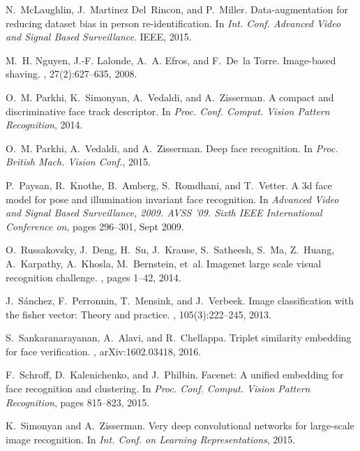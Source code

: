 \documentclass[runningheads]{llncs}
\begin{document}
\begin{thebibliography}{10}
N.~McLaughlin, J.~Martinez Del~Rincon, and P.~Miller.
\newblock Data-augmentation for reducing dataset bias in person
  re-identification.
\newblock In {\em Int. Conf. Advanced Video and Signal Based Surveillance}.
  IEEE, 2015.

M.~H. Nguyen, J.-F. Lalonde, A.~A. Efros, and F.~De~la Torre.
\newblock Image-based shaving.
, 27(2):627--635, 2008.

O.~M. Parkhi, K.~Simonyan, A.~Vedaldi, and A.~Zisserman.
\newblock A compact and discriminative face track descriptor.
\newblock In {\em Proc. Conf. Comput. Vision Pattern Recognition}, 2014.

O.~M. Parkhi, A.~Vedaldi, and A.~Zisserman.
\newblock Deep face recognition.
\newblock In {\em Proc. British Mach. Vision Conf.}, 2015.

P.~Paysan, R.~Knothe, B.~Amberg, S.~Romdhani, and T.~Vetter.
\newblock A 3d face model for pose and illumination invariant face recognition.
\newblock In {\em Advanced Video and Signal Based Surveillance, 2009. AVSS '09.
  Sixth IEEE International Conference on}, pages 296--301, Sept 2009.

O.~Russakovsky, J.~Deng, H.~Su, J.~Krause, S.~Satheesh, S.~Ma, Z.~Huang,
  A.~Karpathy, A.~Khosla, M.~Bernstein, et~al.
\newblock Imagenet large scale visual recognition challenge.
, pages 1--42, 2014.

J.~S{\'a}nchez, F.~Perronnin, T.~Mensink, and J.~Verbeek.
\newblock Image classification with the fisher vector: Theory and practice.
, 105(3):222--245, 2013.

S.~Sankaranarayanan, A.~Alavi, and R.~Chellappa.
\newblock Triplet similarity embedding for face verification.
, arXiv:1602.03418, 2016.

F.~Schroff, D.~Kalenichenko, and J.~Philbin.
\newblock Facenet: A unified embedding for face recognition and clustering.
\newblock In {\em Proc. Conf. Comput. Vision Pattern Recognition}, pages
  815--823, 2015.

K.~Simonyan and A.~Zisserman.
\newblock Very deep convolutional networks for large-scale image recognition.
\newblock In {\em Int. Conf. on Learning Representations}, 2015.


\end{thebibliography}
\end{document}
